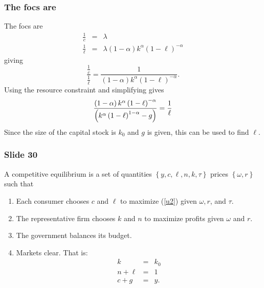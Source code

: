 \documentclass[aspectratio=169]{ltx-talk}
\begin{document}
\begin{frame}
\frametitle{The focs are}
The focs are%
\begin{eqnarray*}
\frac{1}{c} &=&\lambda \\
\frac{1}{\ell } &=&\lambda \left( 1-\alpha \right) k^{\alpha }\left( 1-\ell
\right) ^{-\alpha }
\end{eqnarray*}%
giving%
\begin{equation}
\frac{\frac{1}{c}}{\frac{1}{\ell }}=\frac{1}{\left( 1-\alpha \right)
k^{\alpha }\left( 1-\ell \right) ^{-\alpha }}.  \label{spp}
\end{equation}%
Using the resource constraint and simplifying gives 
\begin{equation}
\frac{\left( 1-\alpha \right) k^{\alpha }\left( 1-\ell \right) ^{-\alpha }}{%
\left( k^{\alpha }\left( 1-\ell \right) ^{1-\alpha }-g\right) }=\frac{1}{%
\ell }  \label{6}
\end{equation}%
Since the size of the capital stock is $k_{0}$ and $g$ is given, this can be
used to find $\ell .$
\end{frame}

\begin{frame}
\frametitle{Slide 30}
A competitive equilibrium is a set of quantities $\left\{ y,c,\ell ,n,k,\tau
\right\} $ prices $\left\{ \omega ,r\right\} $ such that

\begin{enumerate}
\item Each consumer chooses $c$ and $\ell $ to maximize (\ref{u2}) given $%
\omega ,r$, and $\tau $.

\item The representative firm chooses $k$ and $n$ to maximize profits given $%
\omega $ and $r.$

\item The government balances its budget.

\item Markets clear. That is:%
\begin{eqnarray*}
k &=&k_{0} \\
n+\ell &=&1 \\
c+g &=&y.
\end{eqnarray*}%
\end{enumerate}
\end{frame}
\end{document}

